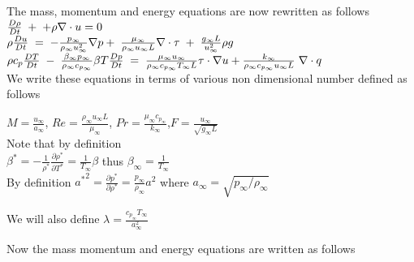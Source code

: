 \documentclass[11pt,a4paper]{article}
\begin{document}
The mass, momentum and energy equations are now rewritten as follows \\
$\frac{D \rho}{D t}\hspace{1mm}+\hspace{1mm}+ \rho \nabla\cdot u = 0$ \\
$\rho\frac{D u}{D t}\hspace{1mm} =\hspace{1mm}-\frac{p_\infty}{\rho_\infty u_\infty^2}\nabla p +\hspace{1mm}\frac{\mu_\infty}{\rho_\infty u_\infty L}\nabla\cdot\tau \hspace{1mm}+\hspace{1mm}\frac{g_\infty L}{u_\infty^2} \rho g$ \\
$ \rho c_p \frac{D T}{D t}\hspace{1mm}-\hspace{1mm}\frac{\beta_\infty p_\infty}{\rho_\infty c_{p_\infty}} \beta T \frac{D p}{D t} \hspace{1mm} = \hspace{1mm} \frac{\mu_\infty u_\infty}{\rho_\infty c_{p_\infty} T_\infty L} \tau \cdot\nabla u  + \frac{k_\infty}{\rho_\infty c_{p_\infty} u_\infty L} \hspace{1mm} \nabla \cdot q$ \\
We write these equations in terms of various non dimensional number defined as follows

$M=\frac{u_\infty}{a_\infty}$, $Re=\frac{\rho_\infty u_\infty L}{\mu_\infty}$, $Pr=\frac{\mu_\infty c_{p_\infty}}{k_\infty}$,$F=\frac{u_\infty}{\sqrt{g_\infty L}}$ \\
Note that by definition \\
$\beta^* = -\frac{1}{\rho^*} \frac{\partial \rho^*}{\partial T^*}= \frac{1}{T_\infty }\beta$ thus $\beta_\infty = \frac{1}{T_\infty}$ \\
By definition ${a^*}^2=\frac{\partial p^*}{\partial \rho^*}=\frac{p_\infty}{\rho_\infty}a^2$ \hspace{1mm} where \hspace{1mm} $a_\infty=\sqrt{p_\infty/\rho_\infty}$ 

We will also define $\lambda = \frac{c_{p_\infty} T_\infty}{a_\infty^2}$

Now the mass momentum and energy equations are written as follows
\end{document}
